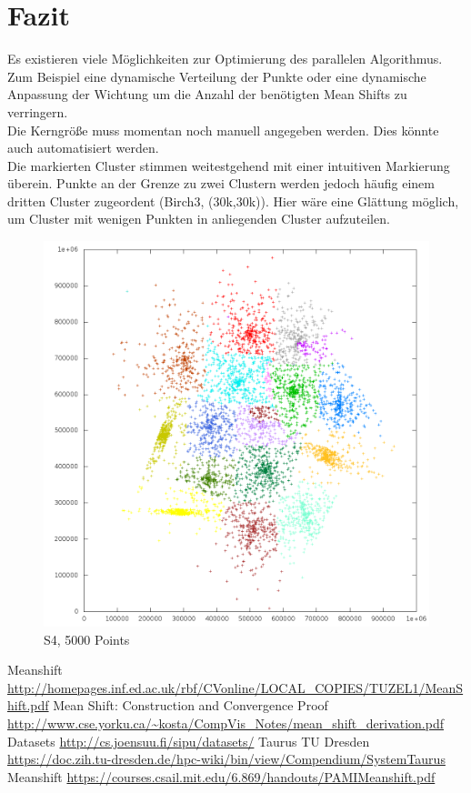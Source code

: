 \section{Fazit}
	Es existieren viele Möglichkeiten zur Optimierung des parallelen Algorithmus. Zum Beispiel eine dynamische Verteilung der Punkte oder eine dynamische Anpassung
	der Wichtung um die Anzahl der benötigten Mean Shifts zu verringern.\\
	Die Kerngröße muss momentan noch manuell angegeben werden. Dies könnte auch automatisiert werden.\\
	Die markierten Cluster stimmen weitestgehend mit einer intuitiven Markierung überein. Punkte an der Grenze zu zwei Clustern werden jedoch häufig einem 
	dritten Cluster zugeordent (Birch3, (30k,30k)). Hier wäre eine Glättung möglich, um Cluster mit wenigen Punkten in anliegenden Cluster aufzuteilen.\\
	\begin{figure}[H]
		\centering
		\includegraphics[scale=0.6]{../meanshift/output/pics/s4_colored.png} 
		\caption{S4, 5000 Points}
	\end{figure}
\begin{thebibliography}{999}
	\bibitem [0] {} Meanshift \url{http://homepages.inf.ed.ac.uk/rbf/CVonline/LOCAL_COPIES/TUZEL1/MeanShift.pdf}
	\bibitem [1] {} Mean Shift: Construction and Convergence Proof \url{http://www.cse.yorku.ca/~kosta/CompVis_Notes/mean_shift_derivation.pdf}
	\bibitem [2] {} Datasets \url{http://cs.joensuu.fi/sipu/datasets/}
	\bibitem [3] {} Taurus TU Dresden \url{https://doc.zih.tu-dresden.de/hpc-wiki/bin/view/Compendium/SystemTaurus}
	\bibitem [4] {} Meanshift \url{https://courses.csail.mit.edu/6.869/handouts/PAMIMeanshift.pdf}
	\newline
\end{thebibliography}
